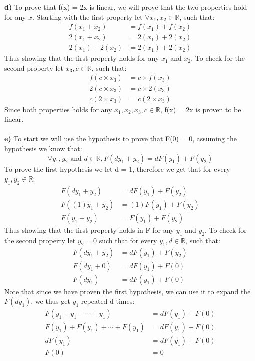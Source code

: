 \documentclass[11pt]{article}
\begin{document}
\textbf{d)} To prove that f(x) = 2x is linear, we will prove that the two properties hold for any $x$. Starting with the first property let $\forall x_{1}, x_{2} \in \mathbb{R}$, such that:
\begin{align*}
f(x_1 + x_2)  &= f(x_1) + f(x_2)\\
2(x_1 + x_2) &= 2(x_1) + 2(x_2)\\
2(x_1) + 2(x_2) &= 2(x_1) + 2(x_2)
\end{align*}
Thus showing that the first property holds for any $x_1$ and $x_2$. To check for the second property let $x_3, c \in \mathbb{R}$, such that:
\begin{align*}
f(c \times x_3)  &= c \times f(x_3)\\
2(c \times x_3)  &= c\times2(x_3)\\
c(2 \times x_3)  &= c(2\times x_3)
\end{align*}
Since both properties holds for any $x_1, x_2, x_3, c \in \mathbb{R}$, f(x) = 2x is proven to be linear.\\\\
\textbf{e)} To start we will use the hypothesis to prove that F(0) = 0, assuming the hypothesis we know that:
\[ \forall y_1,y_2 \text{ and }d \in \mathbb{R}, F(dy_1 + y_2) = dF(y_1) + F(y_2) \]
To prove the first hypothesis we let d = 1, therefore we get that for every $y_1, y_2 \in \mathbb{R}$:
\begin{align*}
F(dy_1 + y_2) &= dF(y_1) + F(y_2)\\
F((1)y_1 + y_2) &= (1)F(y_1) + F(y_2)\\
F(y_1 + y_2) &= F(y_1) + F(y_2)
\end{align*}
Thus showing that the first property holds in F for any $y_1$ and $y_2$. To check for the second property let $y_2 = 0$ such that for every $y_1, d \in \mathbb{R}$, such that:
\begin{align*}
F(dy_1 + y_2) &= dF(y_1) + F(y_2)\\
F(dy_1 + 0) &= dF(y_1) + F(0)\\
F(dy_1) &= dF(y_1) + F(0)
\end{align*}
Note that since we have proven the first hypothesis, we can use it to expand the $F(dy_1)$, we thus get $y_1$ repeated d times:
\begin{align*}
F(y_1 + y_1 + \cdots + y_1) &= dF(y_1) + F(0)\\
F(y_1) + F(y_1) + \cdots + F(y_1) &= dF(y_1) + F(0)\\
dF(y_1) &= dF(y_1) + F(0)\\
F(0) &= 0
\end{align*}
\end{document}
